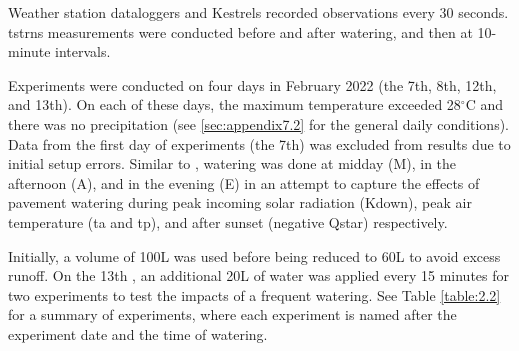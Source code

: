 \documentclass[final,3p,times,authoryear]{elsarticle}
\begin{document}
Weather station dataloggers and Kestrels recorded observations every 30 seconds. \gls{tstrns} measurements were conducted before and after watering, and then at 10-minute intervals.

Experiments were conducted on four days in February 2022 (the 7th, 8th, 12th, and 13th). On each of these days, the maximum temperature exceeded 28$^{\circ}$C and there was no precipitation (see \ref{sec:appendix7.2} for the general daily conditions). Data from the first day of experiments (the 7th) was excluded from results due to initial setup errors. Similar to \cite{Middel2021}, watering was done at midday (M), in the afternoon (A), and in the evening (E) in an attempt to capture the effects of pavement watering during peak incoming solar radiation (\gls{Kdown}), peak air temperature (\gls{ta} and \gls{tp}), and after sunset (negative \gls{Qstar}) respectively.

Initially, a volume of 100L was used before being reduced to 60L to avoid excess runoff. On the 13th , an additional 20L of water was applied every 15 minutes for two experiments to test the impacts of a frequent watering. See Table \ref{table:2.2} for a summary of experiments, where each experiment is named after the experiment date and the time of watering.
\end{document}
